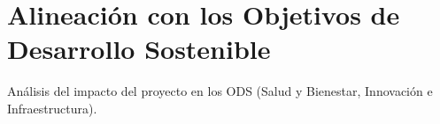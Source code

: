 \chapter[Alineación con los ODS]{Alineación con los Objetivos de Desarrollo Sostenible}
\label{cap:ods}

Análisis del impacto del proyecto en los ODS (Salud y Bienestar, Innovación e Infraestructura).